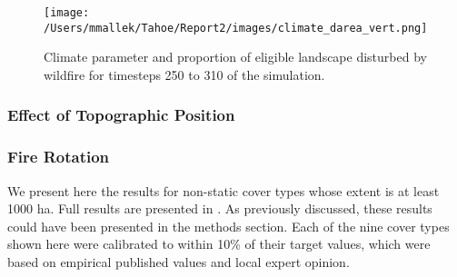 \begin{figure}[!htbp]
\centering
\texttt{[image: /Users/mmallek/Tahoe/Report2/images/climate\_darea\_vert.png]}
\caption{Climate parameter and proportion of eligible landscape disturbed by wildfire for timesteps 250 to 310 of the simulation.}
\label{fig:compare_clim_darea}
\end{figure}

\subsubsection{Effect of Topographic Position}


\newpage
\subsubsection{Fire Rotation}
We present here the results for non-static cover types whose extent is at least 1000 ha. Full results are presented in . As previously discussed, these results could have been presented in the methods section. Each of the nine cover types shown here were calibrated to within 10\% of their target values, which were based on empirical published values and local expert opinion.

